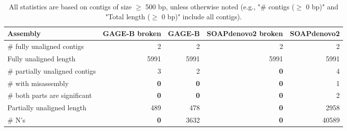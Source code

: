 \documentclass[12pt,a4paper]{article}
\begin{document}
\begin{table}[ht]
\begin{center}
\caption{All statistics are based on contigs of size $\geq$ 500 bp, unless otherwise noted (e.g., "\# contigs ($\geq$ 0 bp)" and "Total length ($\geq$ 0 bp)" include all contigs).}
\begin{tabular}{|l*{4}{|r}|}
\hline
Assembly & GAGE-B broken & GAGE-B & SOAPdenovo2 broken & SOAPdenovo2 \\ \hline
\# fully unaligned contigs & 2 & 2 & 2 & 2 \\ \hline
Fully unaligned length & 5991 & 5991 & 5991 & 5991 \\ \hline
\# partially unaligned contigs & 3 & 2 & {\bf 0} & 4 \\ \hline
\hspace{5mm}\# with misassembly & {\bf 0} & {\bf 0} & {\bf 0} & 1 \\ \hline
\hspace{5mm}\# both parts are significant & {\bf 0} & {\bf 0} & {\bf 0} & 2 \\ \hline
Partially unaligned length & 489 & 478 & {\bf 0} & 2958 \\ \hline
\# N's & {\bf 0} & 3632 & {\bf 0} & 40589 \\ \hline
\end{tabular}
\end{center}
\end{table}
\end{document}
